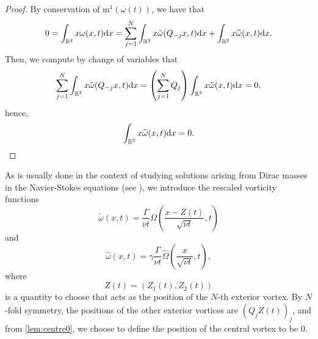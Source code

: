 \documentclass[11pt,reqno,a4paper]{amsart}
\def\dd{{\rm d}}
\def\R {\mathbb{R}} %
\newcommand{\mrm}{\mathrm{m}}
\newcommand{\1}{\mathbbm{1}}
\theoremstyle{definition}
\theoremstyle{definition}
\numberwithin{equation}{section}
\begin{document}
\begin{proof} By conservation of $\mrm^1(\omega(t))$, we have that
\begin{equation}
    0 = \int_{\R^2}x \omega(x,t)\dd x = \sum_{j=1}^N\int_{\R^2}x \tilde{\omega}(Q_{-j}x,t)\dd x + \int_{\R^2}x \widehat{\omega}(x,t)\dd x.
\end{equation}
Then, we compute by change of variables that
\begin{equation}
    \sum_{j=1}^N\int_{\R^2}x \tilde{\omega}(Q_{-j}x,t)\dd x = \left(\sum_{j=1}^N Q_j\right)\int_{\R^2}x \tilde{\omega}(x,t)\dd x = 0,
\end{equation}
hence,
\begin{equation}\label{eq:center_vortex_centered}
    \int_{\R^2}x \widehat{\omega}(x,t)\dd x = 0.
\end{equation}
\end{proof}
As is usually done in the context of studying solutions arising from Dirac masses in the Navier-Stokes equations (see \cite{Gallay2011,dolce2024long,donati2025fast,zhang2025long}), we introduce the rescaled vorticity functions
\begin{equation}
    \tilde{\omega}(x,t) = \frac{\Gamma}{\nu t} \Omega\left( \frac{x-Z(t)}{\sqrt{\nu t}},t\right)
\end{equation}
and
\begin{equation}
    \widehat{\omega}(x,t) = \gamma \frac{\Gamma}{\nu t} \widehat{\Omega}\left( \frac{x}{\sqrt{\nu t}},t\right),
\end{equation}
where
\begin{equation}
    \label{def:Zalpha}
    Z(t)=(Z_1(t),Z_2(t))
\end{equation}
is a quantity to choose that acts as the position of the $N$-th exterior vortex. By $N$-fold symmetry, the positions of the other exterior vortices are $(Q_j Z(t))_j$, and from \cref{lem:centre0}, we choose to define the position of the central vortex to be 0.
\end{document}

